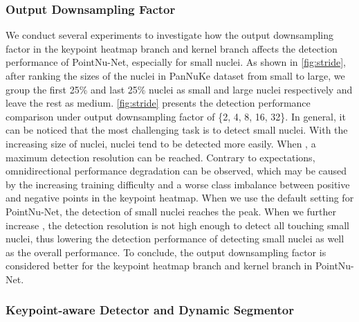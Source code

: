 \documentclass[lettersize,journal]{IEEEtran}
\begin{document}
\subsubsection{Output Downsampling Factor}
We conduct several experiments to investigate how the output downsampling factor  in the keypoint heatmap branch and kernel branch affects the detection performance of PointNu-Net, especially for small nuclei. As shown in \autoref{fig:stride}, after ranking the sizes of the nuclei in PanNuKe dataset from small to large, we group the first 25\% and last 25\% nuclei as small  and large nuclei respectively and leave the rest as medium. \autoref{fig:stride} presents the detection performance comparison under output downsampling factor  of \{2, 4, 8, 16, 32\}. In general, it can be noticed that the most challenging task is to detect small nuclei. With the increasing size of nuclei, nuclei tend to be detected more easily. When , a maximum detection resolution can be reached. Contrary to expectations, omnidirectional performance degradation can be observed, which may be caused by the increasing training difficulty and a worse class imbalance between positive and negative points in the keypoint heatmap. When we use the default setting  for PointNu-Net, the detection of small nuclei reaches the peak. When we further increase , the detection resolution is not high enough to detect all touching small nuclei, thus lowering the detection performance of detecting small nuclei as well as the overall performance. To conclude, the output downsampling factor  is considered better for the keypoint heatmap branch and kernel branch in PointNu-Net.

\subsubsection{Keypoint-aware Detector and Dynamic Segmentor}
\label{sec:abla1}
\end{document}
